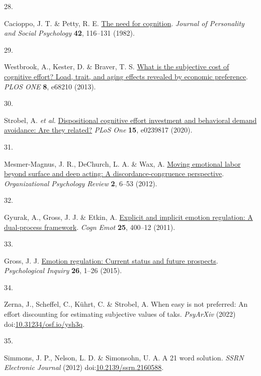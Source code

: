 \documentclass[
  man,floatsintext]{apa6}
\newlength{\cslhangindent}
\newlength{\csllabelwidth}
\newlength{\cslentryspacingunit} %
\newenvironment{CSLReferences}[2] %
 {%
  \setlength{\parindent}{0pt}
  \ifodd #1
  \let\oldpar\par
  \def\par{\hangindent=\cslhangindent\oldpar}
  \fi
  \setlength{\parskip}{#2\cslentryspacingunit}
 }%
 {}
\newcommand{\CSLLeftMargin}[1]{\parbox[t]{\csllabelwidth}{#1}}
\newcommand{\CSLRightInline}[1]{\parbox[t]{\linewidth - \csllabelwidth}{#1}\break}
\begin{document}
\begin{CSLReferences}{0}{0}
\leavevmode{}%
\CSLLeftMargin{28. }%
\CSLRightInline{Cacioppo, J. T. \& Petty, R. E. \href{https://doi.org/10.1037//0022-3514.42.1.116}{The need for cognition}. \emph{Journal of Personality and Social Psychology} \textbf{42}, 116--131 (1982).}

\leavevmode{}%
\CSLLeftMargin{29. }%
\CSLRightInline{Westbrook, A., Kester, D. \& Braver, T. S. \href{https://doi.org/10.1371/journal.pone.0068210}{What is the subjective cost of cognitive effort? {Load}, trait, and aging effects revealed by economic preference}. \emph{PLOS ONE} \textbf{8}, e68210 (2013).}

\leavevmode{}%
\CSLLeftMargin{30. }%
\CSLRightInline{Strobel, A. \emph{et al.} \href{https://doi.org/10.1371/journal.pone.0239817}{Dispositional cognitive effort investment and behavioral demand avoidance: Are they related?} \emph{PLoS One} \textbf{15}, e0239817 (2020).}

\leavevmode{}%
\CSLLeftMargin{31. }%
\CSLRightInline{Mesmer-Magnus, J. R., DeChurch, L. A. \& Wax, A. \href{https://doi.org/10.1177/2041386611417746}{Moving emotional labor beyond surface and deep acting: A discordance-congruence perspective}. \emph{Organizational Psychology Review} \textbf{2}, 6--53 (2012).}

\leavevmode{}%
\CSLLeftMargin{32. }%
\CSLRightInline{Gyurak, A., Gross, J. J. \& Etkin, A. \href{https://doi.org/10.1080/02699931.2010.544160}{Explicit and implicit emotion regulation: A dual-process framework}. \emph{Cogn Emot} \textbf{25}, 400--12 (2011).}

\leavevmode{}%
\CSLLeftMargin{33. }%
\CSLRightInline{Gross, J. J. \href{https://doi.org/10.1080/1047840x.2014.940781}{Emotion regulation: Current status and future prospects}. \emph{Psychological Inquiry} \textbf{26}, 1--26 (2015).}

\leavevmode{}%
\CSLLeftMargin{34. }%
\CSLRightInline{Zerna, J., Scheffel, C., Kührt, C. \& Strobel, A. When easy is not preferred: An effort discounting for estimating subjective values of taks. \emph{PsyArXiv} (2022) doi:\href{https://doi.org/10.31234/osf.io/ysh3q}{10.31234/osf.io/ysh3q}.}

\leavevmode{}%
\CSLLeftMargin{35. }%
\CSLRightInline{Simmons, J. P., Nelson, L. D. \& Simonsohn, U. A. A 21 word solution. \emph{SSRN Electronic Journal} (2012) doi:\href{https://doi.org/10.2139/ssrn.2160588}{10.2139/ssrn.2160588}.}


\end{CSLReferences}
\end{document}

